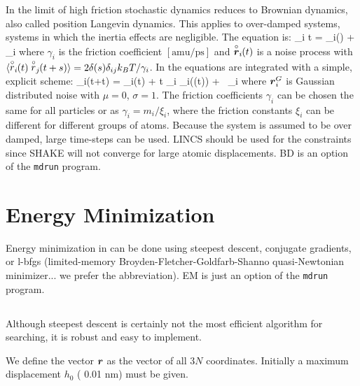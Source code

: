 {\section{}
\label{sec:BD}
In the limit of high friction stochastic dynamics reduces to 
Brownian dynamics, also called position Langevin dynamics.
This applies to over-damped systems, 
{\ie} systems in which the inertia effects are negligible.
The equation is:
\beq
{\de {}_i \over \de t} =  _i() + \vrond_i
\eeq 
where $\gamma_i$ is the friction coefficient $[\mbox{amu/ps}]$ and
$\stackrel{\circ}{\mbox{\boldmath ${r}$}}_i\!\!(t)$  is a noise process with 
$\langle \stackrel{\circ}{r}_i\!\!(t) \stackrel{\circ}{r}_j\!\!(t+s) \rangle = 
    2 \delta(s) \delta_{ij} k_B T / \gamma_i$.
In {\gromacs} the equations are integrated with a simple, explicit scheme:
\beq
{}_i(t+\Delta t) = _i(t) +
        {\Delta t \over \gamma_i} _i((t)) 
        + \, \ruis_i 
\eeq
where $\mbox{\boldmath ${r}$}^G_i$ is Gaussian distributed noise with $\mu = 0$, $\sigma = 1$.
The friction coefficients $\gamma_i$ can be chosen the same for all
particles or as $\gamma_i = m_i/\xi_i$, where the friction constants
$\xi_i$ can be different for different groups of atoms. 
Because the system is assumed to be over damped, large time-steps
can be used. LINCS should be used for the constraints since SHAKE
will not converge for large atomic displacements.
BD is an option of the \verb'mdrun' program.
} %

\section{Energy Minimization}
\label{sec:EM}
Energy minimization in {\gromacs} can be done using 
steepest descent, conjugate gradients, or l-bfgs (limited-memory Broyden-Fletcher-Goldfarb-Shanno quasi-Newtonian minimizer... we prefer the abbreviation). EM is just an option of the {\tt mdrun} program.

\subsection{}
Although steepest descent is certainly not the most efficient
algorithm for searching, it is robust and easy to implement.

We define the vector $\mbox{\boldmath ${r}$}$ as the vector of all $3N$ coordinates.
Initially a maximum displacement $h_0$ ({\eg} 0.01 nm) must be given. 

